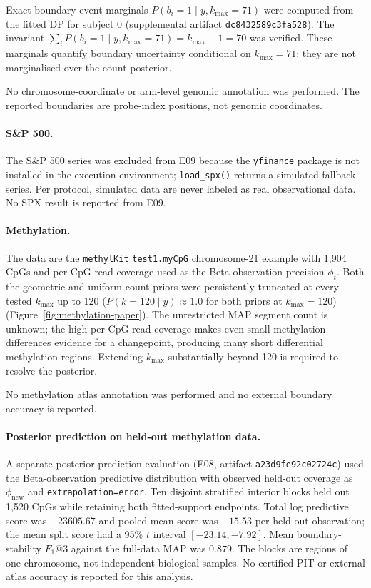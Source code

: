 Exact boundary-event marginals $P(b_i = 1 \mid y, k_{\max}=71)$ were computed from the fitted DP for subject 0 (supplemental artifact \texttt{dc8432589c3fa528}). The invariant $\sum_i P(b_i = 1 \mid y, k_{\max}=71) = k_{\max} - 1 = 70$ was verified. These marginals quantify boundary uncertainty conditional on $k_{\max}=71$; they are not marginalised over the count posterior.

No chromosome-coordinate or arm-level genomic annotation was performed. The reported boundaries are probe-index positions, not genomic coordinates.



\paragraph{S\&P 500.}
The S\&P 500 series was excluded from E09 because the \texttt{yfinance} package is not installed in the execution environment; \texttt{load\_spx()} returns a simulated fallback series. Per protocol, simulated data are never labeled as real observational data. No SPX result is reported from E09.

\paragraph{Methylation.}
The data are the \texttt{methylKit} \texttt{test1.myCpG} chromosome-21 example with 1,904 CpGs and per-CpG read coverage used as the Beta-observation precision $\phi_t$. Both the geometric and uniform count priors were persistently truncated at every tested $k_{\max}$ up to 120 ($P(k=120 \mid y) \approx 1.0$ for both priors at $k_{\max}=120$) (Figure~\ref{fig:methylation-paper}). The unrestricted MAP segment count is unknown; the high per-CpG read coverage makes even small methylation differences evidence for a changepoint, producing many short differential methylation regions. Extending $k_{\max}$ substantially beyond 120 is required to resolve the posterior.

No methylation atlas annotation was performed and no external boundary accuracy is reported.



\paragraph{Posterior prediction on held-out methylation data.}
A separate posterior prediction evaluation (E08, artifact \texttt{a23d9fe92c02724c}) used the Beta-observation predictive distribution with observed held-out coverage as $\phi_{\mathrm{new}}$ and \texttt{extrapolation=error}. Ten disjoint stratified interior blocks held out 1,520 CpGs while retaining both fitted-support endpoints. Total log predictive score was $-23605.67$ and pooled mean score was $-15.53$ per held-out observation; the mean split score had a 95\% $t$ interval $[-23.14, -7.92]$. Mean boundary-stability $F_1@3$ against the full-data MAP was $0.879$. The blocks are regions of one chromosome, not independent biological samples. No certified PIT or external atlas accuracy is reported for this analysis.

